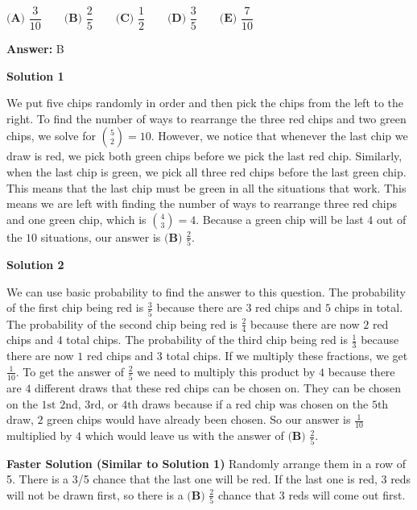 \begin{enumerate}
 $\textbf{(A) }\dfrac{3}{10}\qquad\textbf{(B) }\dfrac{2}{5}\qquad\textbf{(C) }\dfrac{1}{2}\qquad\textbf{(D) }\dfrac{3}{5}\qquad \textbf{(E) }\dfrac{7}{10}$

 \textbf{Answer: }B



\textbf{Solution 1}

We put five chips randomly in order and then pick the chips from the left to the right. To find the number of ways to rearrange the three red chips and two green chips, we solve for $\binom{5}{2} = 10$. However, we notice that whenever the last chip we draw is red, we pick both green chips before we pick the last red chip. Similarly, when the last chip is green, we pick all three red chips before the last green chip. This means that the last chip must be green in all the situations that work. This means we are left with finding the number of ways to rearrange three red chips and one green chip, which is $\binom{4}{3} = 4$. Because a green chip will be last $4$ out of the $10$ situations, our answer is $\boxed{\textbf{(B) } \frac{2}{5}}$.

 



\textbf{Solution 2}

We can use basic probability to find the answer to this question. The probability of the first chip being red is $\frac{3}{5}$ because there are $3$ red chips and $5$ chips in total. The probability of the second chip being red is $\frac{2}{4}$ because there are now $2$ red chips and $4$ total chips. The probability of the third chip being red is $\frac{1}{3}$ because there are now $1$ red chips and $3$ total chips. If we multiply these fractions, we get $\frac{1}{10}$. To get the answer of $\frac{2}{5}$ we need to multiply this product by $4$ because there are $4$ different draws that these red chips can be chosen on. They can be chosen on the $\text{1st 2nd, 3rd, or 4th}$ draws because if a red chip was chosen on the $\text{5th}$ draw, $2$ green chips would have already been chosen. So our answer is $\frac{1}{10}$ multiplied by $4$ which would leave us with the answer of $\boxed{\textbf{(B) } \frac{2}{5}}$.

 \textbf{Faster Solution (Similar to Solution 1)} Randomly arrange them in a row of 5. There is a 3/5 chance that the last one will be red. If the last one is red, 3 reds will not be drawn first, so there is a $\boxed{\textbf{(B) } \frac{2}{5}}$ chance that 3 reds will come out first.

 



\end{enumerate}
